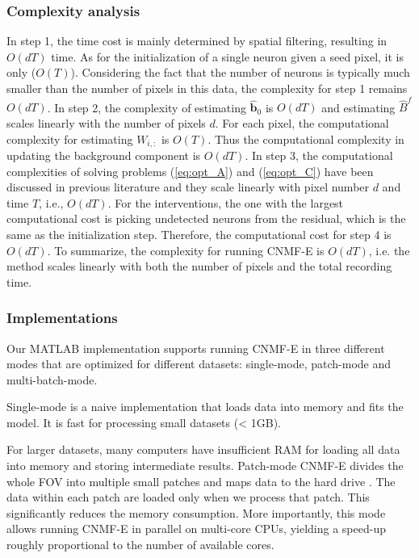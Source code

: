 \documentclass[9pt,lineno]{elife}
\begin{document}
\subsubsection{Complexity analysis}
In step 1, the time cost is mainly determined by spatial filtering, resulting in $O(dT)$ time. As for the initialization of a single neuron given a seed pixel, it is only ($O(T)$). Considering the fact that the number of neurons is typically much smaller than the number of pixels in this data, the complexity for step 1 remains $O(dT)$.  In step 2, the complexity of estimating $\hat{\bm{b}}_0$ is $O(dT)$ and estimating $\hat{B}^f$ scales linearly with the number of pixels $d$. For each pixel, the computational complexity for estimating $W_{i,:}$ is $O(T)$. Thus the computational complexity in updating the background component is $O(dT)$. In step 3, the computational complexities of solving problems (\ref{eq:opt_A}) and (\ref{eq:opt_C}) have been discussed in previous literature \citep{Pnevmatikakis2016} and they scale linearly with pixel number $d$ and time $T$, i.e., $O(dT)$. For the interventions, the one with the largest computational cost is picking undetected neurons from the residual, which is the same as the initialization step. Therefore, the computational cost for step 4 is $O(dT)$. To summarize, the complexity for running CNMF-E is $O(dT)$, i.e. the method scales linearly with both the number of pixels and the total recording time. 

\subsubsection{Implementations}

Our MATLAB implementation supports running CNMF-E in three different modes that are optimized for different datasets: single-mode, patch-mode and multi-batch-mode. 

Single-mode is a naive implementation that loads data into memory and fits the model. It is fast for processing small datasets (< 1GB).  

For larger datasets, many computers have insufficient RAM for loading all data into memory and storing intermediate results. Patch-mode CNMF-E divides the whole FOV into multiple small patches and maps data to the hard drive \citep{giovannucci2017}. The data within each patch are loaded  only when we process that patch. This significantly reduces the memory consumption. More importantly, this mode allows running CNMF-E in parallel on multi-core CPUs, yielding a speed-up roughly proportional to the number of available cores. 
\end{document}
